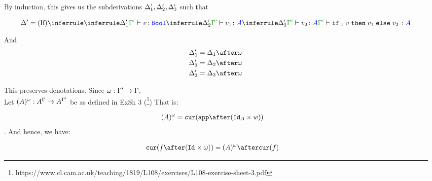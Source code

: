 \documentclass{report}
\begin{document}
By induction, this gives us the subderivations $\Delta_1', \Delta_2', \Delta_3'$ such that

\begin{equation}
    \D' = \ntreeruleIII{If}{
        \treeruleI{\D_1'}{\typerelation{\G'}{v}{\B}}
        }{
        \treeruleI{\D_2'}{\typerelation{\G'}{v_1}{ A}}
        }{
        \treeruleI{\D_3'}{\typerelation{\G'}{v_2}{ A}}
    }{
        \typerelation{\G'}{\pifthenelse{A}{v}{v_1}{v_2}}{ A}
    }
\end{equation}

And 
\begin{align}
    \D_1' & =\D_1 \after \w\\
    \D_3' & =\D_2 \after \w\\
    \D_3' & =\D_3 \after \w 
\end{align}


This preserves denotations.
Since $\omega: \Gamma' \rightarrow \Gamma$, \\
Let $(A)^{\omega}: A^{\Gamma}\rightarrow A^{\Gamma'}$ be as defined in ExSh 3 (\footnote{https://www.cl.cam.ac.uk/teaching/1819/L108/exercises/L108-exercise-sheet-3.pdf})
That is:

\begin{align}
    (A)^{\w} & = \cur{\app\after(\Id{A}\times w)}
\end{align}.
And hence, we have:

\begin{align}
    \cur{f\after(\Id{}\times \w)} & = (A)^{\w} \after\cur{f}
\end{align}
\end{document}
